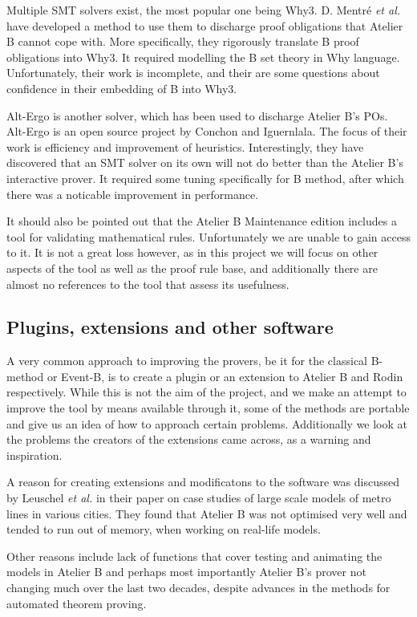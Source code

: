 \documentclass[11pt,journal]{IEEEtran}
\begin{document}
	Multiple SMT solvers exist, the most popular one being Why3. D. Mentr\'{e} \emph{et al.} have developed a method to use them to discharge proof obligations that Atelier B cannot cope with. More specifically, they rigorously translate B proof obligations into Why3. It required modelling the B set theory in Why language. Unfortunately, their work is incomplete, and their are some questions about confidence in their embedding of B into Why3.
	
	Alt-Ergo is another solver, which has been used to discharge Atelier B's POs.\cite{Alt-Ergo} Alt-Ergo is an open source project by Conchon and Iguernlala. The focus of their work is efficiency and improvement of heuristics. Interestingly, they have discovered that an SMT solver on its own will not do better than the Atelier B's interactive prover. It required some tuning specifically for B method, after which there was a noticable improvement in performance.
	
	It should also be pointed out that the Atelier B Maintenance edition includes a tool for validating mathematical rules. Unfortunately we are unable to gain access to it. It is not a great loss however, as in this project we will focus on other aspects of the tool as well as the proof rule base, and additionally there are almost no references to the tool that assess its usefulness.
	
	\subsection{Plugins, extensions and other software}
	
	A very common approach to improving the provers, be it for the classical B-method or Event-B, is to create a plugin or an extension to Atelier B and Rodin respectively. While this is not the aim of the project, and we make an attempt to improve the tool by means available through it, some of the methods are portable and give us an idea of how to approach certain problems. Additionally we look at the problems the creators of the extensions came across, as a warning and inspiration.
	
	A reason for creating extensions and modificatons to the software was discussed by Leuschel \emph{et al.} in their paper on case studies of large scale models of metro lines in various cities\cite{San Juan metro}. They found that Atelier B was not optimised very well and tended to run out of memory, when working on real-life models.
	
	Other reasons include lack of functions that cover testing and animating the models in Atelier B and perhaps most importantly Atelier B's prover not changing much over the last two decades, despite advances in the methods for automated theorem proving.
	
\end{document}
